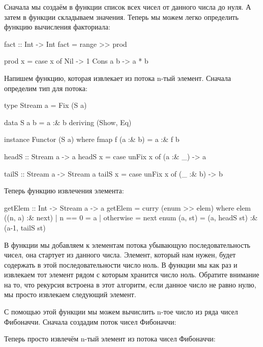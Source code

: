 Сначала мы создаём в функции  список 
всех чисел от данного числа до нуля. А затем в функции
 складываем значения. Теперь мы можем легко
определить функцию вычисления факториала:

\begin{code}
fact :: Int -> Int
fact = range >> prod
    
prod x = case x of
    Nil      -> 1 
    Cons a b -> a * b
\end{code}

Напишем функцию, которая извлекает из потока n-тый элемент.
Сначала определим тип для потока:

\begin{code}
type Stream a = Fix (S a)

data S a b = a :& b
    deriving (Show, Eq)

instance Functor (S a) where
    fmap f (a :& b) = a :& f b  


headS :: Stream a -> a
headS x = case unFix x of
    (a :& _) -> a


tailS :: Stream a -> Stream a
tailS x = case unFix x of
    (_ :& b) -> b
\end{code}


Теперь функцию извлечения элемента:

\begin{code}
getElem :: Int -> Stream a -> a
getElem = curry (enum >> elem) 
    where elem ((n, a) :& next) 
                | n == 0    = a
                | otherwise = next
          enum (a, st) = (a, headS st) :& (a-1, tailS st)
\end{code}

В функции  мы добавляем  к элементам потока
убывающую последовательность чисел, она стартует из данного
числа. Элемент, который нам нужен, будет содержать в этой последовательности
число ноль. В функции  мы как раз и извлекаем тот элемент
рядом с которым хранится число ноль. Обратите внимание на то, что
рекурсия встроена в этот алгоритм, если данное число не равно нулю,
мы просто извлекаем следующий элемент.

С помощью этой функции мы можем вычислить n-тое число
из ряда чисел Фибоначчи. Сначала создадим поток чисел
Фибоначчи:


Теперь просто извлечём n-тый элемент из потока
чисел Фибоначчи:

